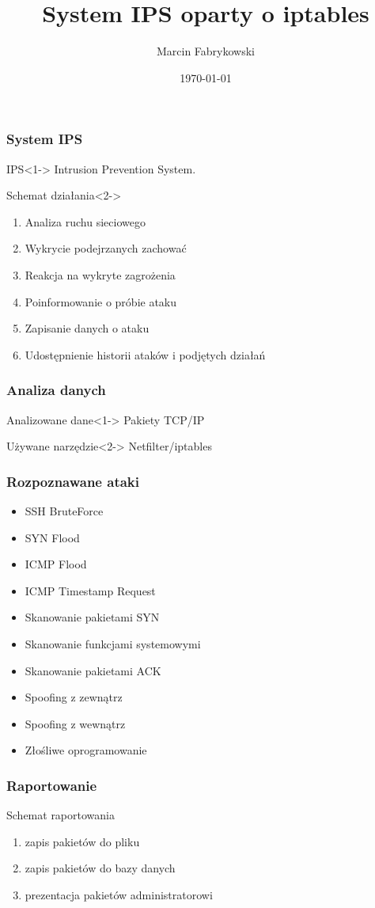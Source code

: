 \documentclass{beamer}
\title{System IPS oparty o iptables}
\author{Marcin Fabrykowski}
\date{\today}
\begin{document}
\titleframe[pl]

\begin{frame}
\frametitle{System IPS}
    \begin{block}{IPS}<1->
        Intrusion Prevention System.\\
    \end{block}
	\begin{block}{Schemat działania}<2->
		\begin{enumerate}
			\item Analiza ruchu sieciowego
			\item Wykrycie podejrzanych zachować
			\item Reakcja na wykryte zagrożenia
			\item Poinformowanie o próbie ataku
			\item Zapisanie danych o ataku
			\item Udostępnienie historii ataków i podjętych działań
		\end{enumerate}
	\end{block}
\end{frame}
\begin{frame}
\frametitle{Analiza danych}
	\begin{block}{Analizowane dane}<1->
	Pakiety TCP/IP
	\end{block}
	\begin{block}{Używane narzędzie}<2->
	Netfilter/iptables
	\end{block}
\end{frame}
\begin{frame}
\frametitle{Rozpoznawane ataki}
	\begin{itemize}
		\item SSH BruteForce
		\item SYN Flood
		\item ICMP Flood
		\item ICMP Timestamp Request
		\item Skanowanie pakietami SYN
		\item Skanowanie funkcjami systemowymi
		\item Skanowanie pakietami ACK
		\item Spoofing z zewnątrz
		\item Spoofing z wewnątrz
		\item Złośliwe oprogramowanie
	\end{itemize}
\end{frame}
\begin{frame}
\frametitle{Raportowanie}
	\begin{block}{Schemat raportowania}
		\begin{enumerate}
			\item zapis pakietów do pliku
			\item zapis pakietów do bazy danych
			\item prezentacja pakietów administratorowi
		\end{enumerate}
	\end{block}
\end{frame}
\end{document}
